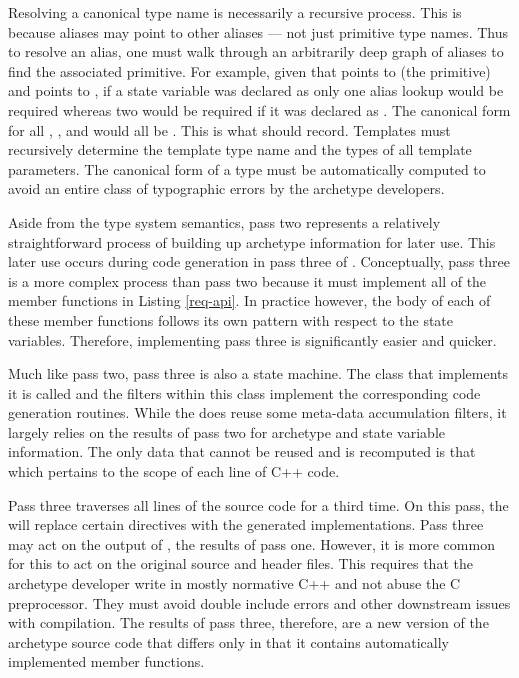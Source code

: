Resolving a canonical type name is necessarily a recursive process.
This is because aliases may point to other aliases --- not just primitive type names.
Thus to resolve an alias, one must walk through an arbitrarily deep graph of aliases 
to find the associated primitive.  For example, given that  points 
to  (the primitive) and  points to , 
if a state variable was declared as  only one alias lookup would
be required whereas two would be required
if it was declared as . The canonical
form for all , , and  would all be 
.  This is what \cycpp should record.  Templates must recursively 
determine the template type name and the types of all template parameters.
The canonical form of a type must be automatically computed to avoid an
entire class of typographic errors by the archetype developers.

Aside from the type system semantics, pass two represents a relatively straightforward
process of building up archetype information for later use. This
later use occurs during code generation in pass three of \cycpp. Conceptually, 
pass three is a more complex process than pass two because it must implement 
all of the member functions in Listing \ref{req-api}. In practice however, the body 
of each of these member functions follows its own pattern with respect to the 
state variables. Therefore, implementing pass three is significantly easier and quicker. 

Much like pass two, pass three is also a state machine. The class that implements it is 
called  and the filters within this class implement 
the corresponding code generation routines.  While the   does 
reuse some meta-data accumulation filters, it largely relies on the results of 
pass two for archetype and state variable information.  The only data that cannot be 
reused and is recomputed is that which pertains to the scope of each line of C++ code.

Pass three traverses all lines of the source code for a third time.
On this pass, the  will replace certain 
directives with the generated implementations.  Pass three may act on the output of
, the results of pass one.  However, it is more common for this 
to act on the original source and header files.  This requires that the 
archetype developer write in mostly normative C++ and not abuse the C
preprocessor. They must 
avoid double include errors and other downstream issues with 
compilation. The results of pass three, therefore, are a new version of the 
archetype
source code that differs only in that it contains automatically implemented 
member functions.

